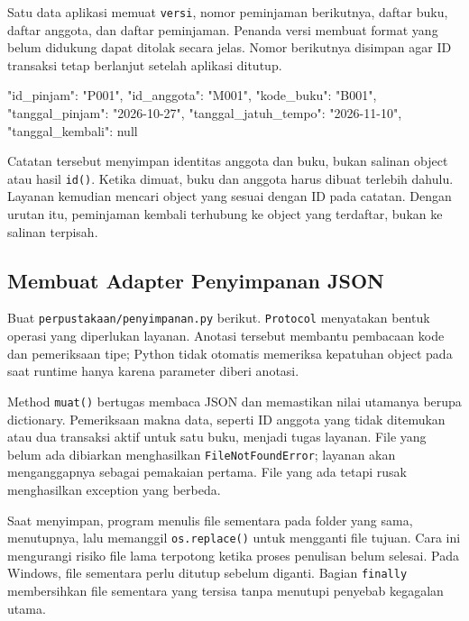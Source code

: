 Satu data aplikasi memuat \texttt{versi}, nomor peminjaman berikutnya, daftar buku, daftar anggota, dan daftar peminjaman. Penanda versi membuat format yang belum didukung dapat ditolak secara jelas. Nomor berikutnya disimpan agar ID transaksi tetap berlanjut setelah aplikasi ditutup.

\begin{keluaran}
{
  "id_pinjam": "P001",
  "id_anggota": "M001",
  "kode_buku": "B001",
  "tanggal_pinjam": "2026-10-27",
  "tanggal_jatuh_tempo": "2026-11-10",
  "tanggal_kembali": null
}
\end{keluaran}

Catatan tersebut menyimpan identitas anggota dan buku, bukan salinan object atau hasil \texttt{id()}. Ketika dimuat, buku dan anggota harus dibuat terlebih dahulu. Layanan kemudian mencari object yang sesuai dengan ID pada catatan. Dengan urutan itu, peminjaman kembali terhubung ke object yang terdaftar, bukan ke salinan terpisah.

\subsection{Membuat Adapter Penyimpanan JSON}

Buat \texttt{perpustakaan/penyimpanan.py} berikut. \texttt{Protocol} menyatakan bentuk operasi yang diperlukan layanan. Anotasi tersebut membantu pembacaan kode dan pemeriksaan tipe; Python tidak otomatis memeriksa kepatuhan object pada saat runtime hanya karena parameter diberi anotasi.

\begin{kode}
\end{kode}

Method \texttt{muat()} bertugas membaca JSON dan memastikan nilai utamanya berupa dictionary. Pemeriksaan makna data, seperti ID anggota yang tidak ditemukan atau dua transaksi aktif untuk satu buku, menjadi tugas layanan. File yang belum ada dibiarkan menghasilkan \texttt{FileNotFoundError}; layanan akan menganggapnya sebagai pemakaian pertama. File yang ada tetapi rusak menghasilkan exception yang berbeda.

Saat menyimpan, program menulis file sementara pada folder yang sama, menutupnya, lalu memanggil \texttt{os.replace()} untuk mengganti file tujuan. Cara ini mengurangi risiko file lama terpotong ketika proses penulisan belum selesai. Pada Windows, file sementara perlu ditutup sebelum diganti. Bagian \texttt{finally} membersihkan file sementara yang tersisa tanpa menutupi penyebab kegagalan utama.

